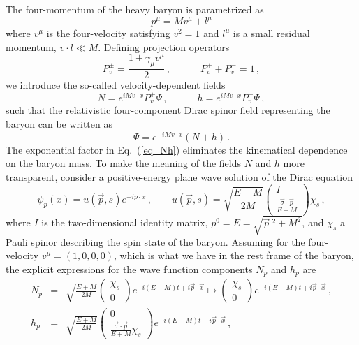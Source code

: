 \documentclass[sort&compress,preprint,3p]{elsarticle}
\begin{document}
The four-momentum of the heavy baryon is parametrized as
\begin{equation}
p^\mu=Mv^\mu+l^\mu
\label{eq_pmu}
\end{equation}
where $v^\mu$ is the four-velocity satisfying $v^2=1$ and
$l^\mu$ is a small residual momentum, $v\cdot l \ll M$.
Defining projection operators
\begin{equation}
P_v^\pm=\frac{1\pm \gamma_\mu v^\mu}{2} \,,
\quad \quad \quad
P_v^+ + P_v^- = 1 \,,
\end{equation}
we introduce the so-called velocity-dependent fields
\begin{equation}
N=e^{iMv\cdot x} P_v^+ \Psi \,,
\quad \quad \quad
h=e^{iMv\cdot x} P_v^- \Psi \,,
\label{eq_Nh}
\end{equation}
such that the relativistic four-component 
Dirac spinor field representing the baryon can be written as
\begin{equation}
\Psi=e^{-iMv\cdot x}(N+h) \,.
\label{eq_PsiNh}
\end{equation}
The exponential factor in Eq.~(\ref{eq_Nh}) eliminates the kinematical dependence
on the baryon mass.
To make the meaning of the fields $N$ and $h$ more
transparent, consider a positive-energy plane wave solution of
the Dirac equation
\begin{equation}
\psi_p(x)=u(\vec p,s) e^{-i p\cdot x} \,,
\quad \quad
	u(\vec p,s) = \sqrt{\frac{E+M}{2M}} 
        \left(
	\begin{array}{c}
	  I   \\
	\frac{\vec \sigma \cdot \vec p}{E+M}
	\end{array}
	\right)
        \chi_s
\,,
\end{equation}
where $I$ is the two-dimensional identity matrix, 
$p^0=E=\sqrt{{\vec p}~^2+M^2}$, and $\chi_s$ a Pauli 
spinor describing the spin state of the baryon.
Assuming for the four-velocity $v^\mu = (1,0,0,0)$,
which is what we have in the rest frame of the baryon,
the explicit expressions for the wave function components
$N_p$ and $h_p$ are
\begin{eqnarray}
N_p&=&\sqrt{\frac{E+M}{2M}}
        \left(
	\begin{array}{c}
	 \chi_s\\
	   0
	\end{array}
	\right)
  e^{-i(E-M)t+i\vec p \cdot \vec x} 
\longmapsto 
        \left(
	\begin{array}{c}
	 \chi_s\\
	   0
	\end{array}
	\right)
  e^{-i(E-M)t+i\vec p \cdot \vec x} 
\,,
\\
h_p&=&\sqrt{\frac{E+M}{2M}}
        \left(
	\begin{array}{c}
	   0   \\
	\frac{\vec \sigma \cdot \vec p}{E+M}\chi_s
	\end{array}
	\right)
  e^{-i(E-M)t+i\vec p \cdot \vec x} \,,
\end{eqnarray}
\end{document}
